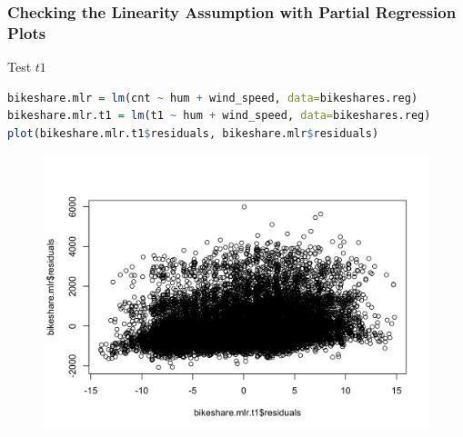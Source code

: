 \documentclass[11pt,a4paper]{article}
\begin{document}
\subsubsection{Checking the Linearity Assumption with Partial Regression Plots}
Test $t1$
\begin{lstlisting}[language=R]
bikeshare.mlr = lm(cnt ~ hum + wind_speed, data=bikeshares.reg)
bikeshare.mlr.t1 = lm(t1 ~ hum + wind_speed, data=bikeshares.reg)
plot(bikeshare.mlr.t1$residuals, bikeshare.mlr$residuals)
\end{lstlisting}
\begin{center}\begin{figure}[htbp]
  \centering
  \includegraphics[scale=0.2]{d5}
  \caption{}
  \label{}
\end{figure}\end{center}
\end{document}
